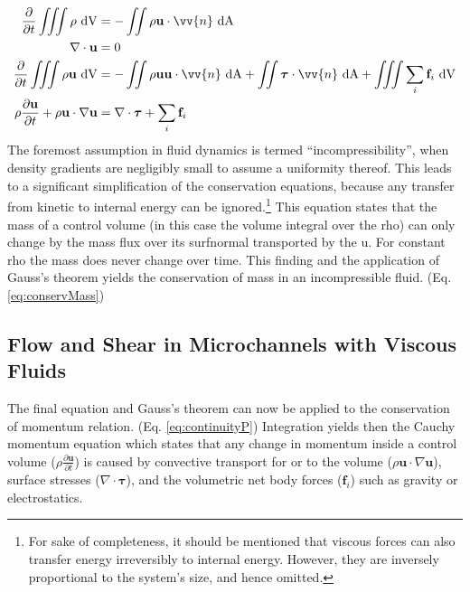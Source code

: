 \begin{align}
	\frac{\partial}{\partial t} \iiint \rho \ \mathrm{dV} &= - \iint \rho \mathbf{u} \cdot \vv{n} \ \mathrm{dA} \label{eq:continuityM}\\
	\nabla \cdot \mathbf{u} &= 0 \label{eq:conservMass}\\	
	\frac{\partial}{\partial t} \iiint \rho\mathbf{u} \ \mathrm{dV} &= - \iint \rho \mathbf{u}\mathbf{u} \cdot \vv{n} \ \mathrm{dA} + \iint \boldsymbol{\tau} \cdot \vv{n} \ \mathrm{dA}  + \iiint  \sum_{i}\mathbf{f}_i \ \mathrm{dV} \label{eq:continuityP} \\	
		\rho \frac{\partial \mathbf{u}}{\partial t} + \rho\mathbf{u} \cdot \nabla \mathbf{u} &= \nabla \cdot \boldsymbol{\tau} + \sum_{i}\mathbf{f}_i \label{eq:cauchymomentum} \\			
\end{align}
The foremost assumption in fluid dynamics is termed ``incompressibility'', when density gradients are negligibly small to assume a uniformity thereof. This leads to a significant simplification of the conservation equations, because any transfer from kinetic to internal energy can be ignored.\footnote{For sake of completeness, it should be mentioned that viscous forces can also transfer energy irreversibly to internal energy. However, they are inversely proportional to the system's size, and hence omitted.}
This equation states that the mass of a control volume (in this case the volume integral over the \gls{rho}) can only change by the mass flux over its \gls{surfnormal} transported by the \gls{u}. For constant \gls{rho} the mass does never change over time. This finding and the application of Gauss's theorem yields the conservation of mass in an incompressible fluid. (Eq. \ref{eq:conservMass})


\subsection{Flow and Shear in Microchannels with Viscous Fluids}

The final equation and Gauss's theorem can now be applied to the conservation of momentum relation. (Eq. \ref{eq:continuityP}) Integration yields then the Cauchy momentum equation which states that any change in momentum inside a control volume ($\rho \frac{\partial \mathbf{u}}{\partial t}$) is caused by convective transport for or to the volume ($\rho\mathbf{u} \cdot \nabla \mathbf{u}$), surface stresses ($ \nabla \cdot \boldsymbol{\tau}$), and the volumetric net body forces ($\mathbf{f}_i$) such as gravity or electrostatics.

